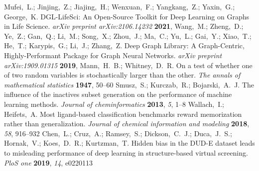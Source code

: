 \documentclass[journal=jcisd8,manuscript=article]{achemso} %
\providecommand{\DIFaddbegin}{} %
\begin{document}
\begin{mcitethebibliography}{34}
Mufei,~L.; Jinjing,~Z.; Jiajing,~H.; Wenxuan,~F.; Yangkang,~Z.; Yaxin,~G.;
  George,~K. DGL-LifeSci: An Open-Source Toolkit for Deep Learning on Graphs in
  Life Science. \emph{arXiv preprint arXiv:2106.14232} \textbf{2021}, \relax
\mciteBstWouldAddEndPunctfalse
\mciteSetBstMidEndSepPunct{\mcitedefaultmidpunct}
{}{\mcitedefaultseppunct}\relax
\EndOfBibitem
{}
Wang,~M.; Zheng,~D.; Ye,~Z.; Gan,~Q.; Li,~M.; Song,~X.; Zhou,~J.; Ma,~C.;
  Yu,~L.; Gai,~Y.; Xiao,~T.; He,~T.; Karypis,~G.; Li,~J.; Zhang,~Z. Deep Graph
  Library: A Graph-Centric, Highly-Performant Package for Graph Neural
  Networks. \emph{arXiv preprint arXiv:1909.01315} \textbf{2019}, \relax
\mciteBstWouldAddEndPunctfalse
\mciteSetBstMidEndSepPunct{\mcitedefaultmidpunct}
{}{\mcitedefaultseppunct}\relax
\EndOfBibitem
{}
Mann,~H.~B.; Whitney,~D.~R. On a test of whether one of two random variables is
  stochastically larger than the other. \emph{The annals of mathematical
  statistics} \textbf{1947}, 50--60\relax
\mciteBstWouldAddEndPuncttrue
\mciteSetBstMidEndSepPunct{\mcitedefaultmidpunct}
{\mcitedefaultendpunct}{\mcitedefaultseppunct}\relax
\EndOfBibitem
{}
Smusz,~S.; Kurczab,~R.; Bojarski,~A.~J. The influence of the inactives subset
  generation on the performance of machine learning methods. \emph{Journal of
  cheminformatics} \textbf{2013}, \emph{5}, 1--8\relax
\mciteBstWouldAddEndPuncttrue
\mciteSetBstMidEndSepPunct{\mcitedefaultmidpunct}
{\mcitedefaultendpunct}{\mcitedefaultseppunct}\relax
\EndOfBibitem
{}
Wallach,~I.; Heifets,~A. Most ligand-based classification benchmarks reward
  memorization rather than generalization. \emph{Journal of chemical
  information and modeling} \textbf{2018}, \emph{58}, 916--932\relax
\mciteBstWouldAddEndPuncttrue
\mciteSetBstMidEndSepPunct{\mcitedefaultmidpunct}
{\mcitedefaultendpunct}{\mcitedefaultseppunct}\relax
\EndOfBibitem
{}
Chen,~L.; Cruz,~A.; Ramsey,~S.; Dickson,~C.~J.; Duca,~J.~S.; Hornak,~V.;
  Koes,~D.~R.; Kurtzman,~T. Hidden bias in the DUD-E dataset leads to
  misleading performance of deep learning in structure-based virtual screening.
  \emph{PloS one} \textbf{2019}, \emph{14}, e0220113\relax
\mciteBstWouldAddEndPuncttrue
\mciteSetBstMidEndSepPunct{\mcitedefaultmidpunct}
{\mcitedefaultendpunct}{\mcitedefaultseppunct}\relax
\EndOfBibitem
\end{mcitethebibliography}
\DIFaddbegin 
\end{document}
